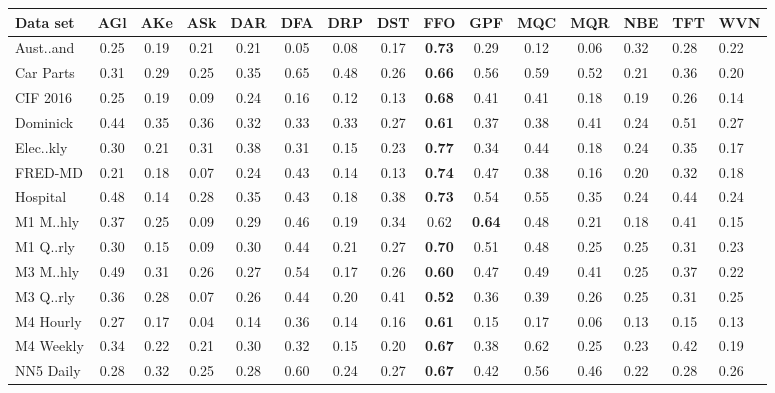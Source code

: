 
    \begin{tabular}{l|ccccccccccc}
        \toprule 
        Data set & AGl & AKe & ASk & DAR & DFA & DRP & DST & FFO & GPF & MQC & MQR & NBE & TFT & WVN \\
        \midrule
        Aust..and & 0.25 & 0.19 & 0.21 & 0.21 & 0.05 & 0.08 & 0.17 & \textbf{0.73} & 0.29 & 0.12 & 0.06 & 0.32 & 0.28 & 0.22 \\
        Car Parts & 0.31 & 0.29 & 0.25 & 0.35 & 0.65 & 0.48 & 0.26 & \textbf{0.66} & 0.56 & 0.59 & 0.52 & 0.21 & 0.36 & 0.20 \\
        CIF 2016 & 0.25 & 0.19 & 0.09 & 0.24 & 0.16 & 0.12 & 0.13 & \textbf{0.68} & 0.41 & 0.41 & 0.18 & 0.19 & 0.26 & 0.14 \\
        Dominick & 0.44 & 0.35 & 0.36 & 0.32 & 0.33 & 0.33 & 0.27 & \textbf{0.61} & 0.37 & 0.38 & 0.41 & 0.24 & 0.51 & 0.27 \\
        Elec..kly & 0.30 & 0.21 & 0.31 & 0.38 & 0.31 & 0.15 & 0.23 & \textbf{0.77} & 0.34 & 0.44 & 0.18 & 0.24 & 0.35 & 0.17 \\
        FRED-MD & 0.21 & 0.18 & 0.07 & 0.24 & 0.43 & 0.14 & 0.13 & \textbf{0.74} & 0.47 & 0.38 & 0.16 & 0.20 & 0.32 & 0.18 \\
        Hospital & 0.48 & 0.14 & 0.28 & 0.35 & 0.43 & 0.18 & 0.38 & \textbf{0.73} & 0.54 & 0.55 & 0.35 & 0.24 & 0.44 & 0.24 \\
        M1 M..hly & 0.37 & 0.25 & 0.09 & 0.29 & 0.46 & 0.19 & 0.34 & 0.62 & \textbf{0.64} & 0.48 & 0.21 & 0.18 & 0.41 & 0.15 \\
        M1 Q..rly & 0.30 & 0.15 & 0.09 & 0.30 & 0.44 & 0.21 & 0.27 & \textbf{0.70} & 0.51 & 0.48 & 0.25 & 0.25 & 0.31 & 0.23 \\
        M3 M..hly & 0.49 & 0.31 & 0.26 & 0.27 & 0.54 & 0.17 & 0.26 & \textbf{0.60} & 0.47 & 0.49 & 0.41 & 0.25 & 0.37 & 0.22 \\
        M3 Q..rly & 0.36 & 0.28 & 0.07 & 0.26 & 0.44 & 0.20 & 0.41 & \textbf{0.52} & 0.36 & 0.39 & 0.26 & 0.25 & 0.31 & 0.25 \\
        M4 Hourly & 0.27 & 0.17 & 0.04 & 0.14 & 0.36 & 0.14 & 0.16 & \textbf{0.61} & 0.15 & 0.17 & 0.06 & 0.13 & 0.15 & 0.13 \\
        M4 Weekly & 0.34 & 0.22 & 0.21 & 0.30 & 0.32 & 0.15 & 0.20 & \textbf{0.67} & 0.38 & 0.62 & 0.25 & 0.23 & 0.42 & 0.19 \\
        NN5 Daily & 0.28 & 0.32 & 0.25 & 0.28 & 0.60 & 0.24 & 0.27 & \textbf{0.67} & 0.42 & 0.56 & 0.46 & 0.22 & 0.28 & 0.26 \\

\end{tabular}
